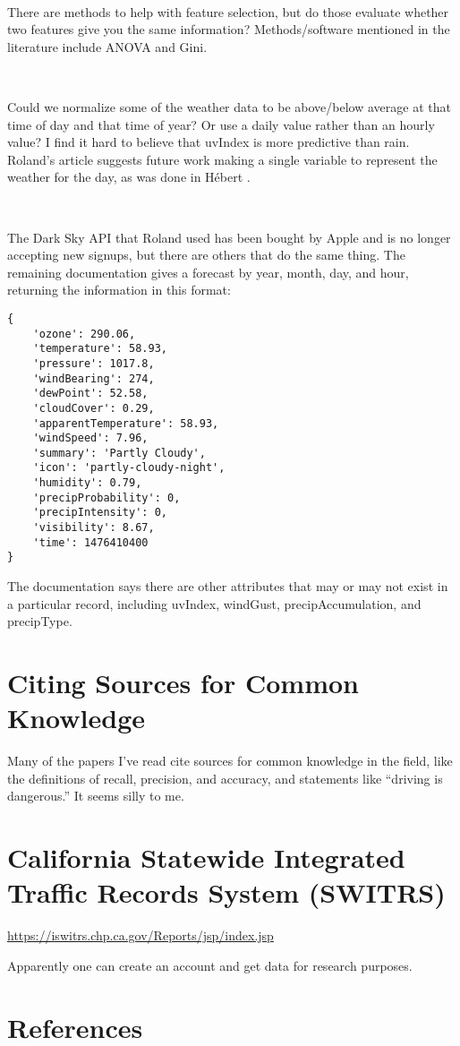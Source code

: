 \documentclass[11pt]{article}
\begin{document}
\begin{spacing}{1.2}
\

There are methods to help with feature selection, but do those evaluate whether two features give you the same information?  Methods/software mentioned in the literature include ANOVA and Gini.  

\

Could we normalize some of the weather data to be above/below average at that time of day and that time of year?  Or use a daily value rather than an hourly value?  I find it hard to believe that uvIndex is more predictive than rain.  Roland's article suggests future work making a single variable to represent the weather for the day, as was done in H\'ebert \cite{Hebert_2019}.

\

The Dark Sky API that Roland used has been bought by Apple and is no longer accepting new signups, but there are others that do the same thing.  The remaining documentation gives a forecast by year, month, day, and hour, returning the information in this format:

\begin{verbatim}
{
	'ozone': 290.06, 
	'temperature': 58.93, 
	'pressure': 1017.8, 
	'windBearing': 274, 
	'dewPoint': 52.58, 
	'cloudCover': 0.29, 
	'apparentTemperature': 58.93, 
	'windSpeed': 7.96, 
	'summary': 'Partly Cloudy', 
	'icon': 'partly-cloudy-night', 
	'humidity': 0.79, 
	'precipProbability': 0, 
	'precipIntensity': 0, 
	'visibility': 8.67, 
	'time': 1476410400
}
\end{verbatim}

The documentation says there are other attributes that may or may not exist in a particular record, including uvIndex, windGust, precipAccumulation, and precipType.  

\section{Citing Sources for Common Knowledge}

Many of the papers I've read cite sources for common knowledge in the field, like the definitions of recall, precision, and accuracy, and statements like ``driving is dangerous.''  It seems silly to me.  

\section{California Statewide Integrated Traffic Records System (SWITRS)}

\url{https://iswitrs.chp.ca.gov/Reports/jsp/index.jsp}

Apparently one can create an account and get data for research purposes.  

\section{References}
\label{sec:references}
\printbibliography[heading=none]


\clearpage
{}
\printindex

\end{spacing}
\end{document}
